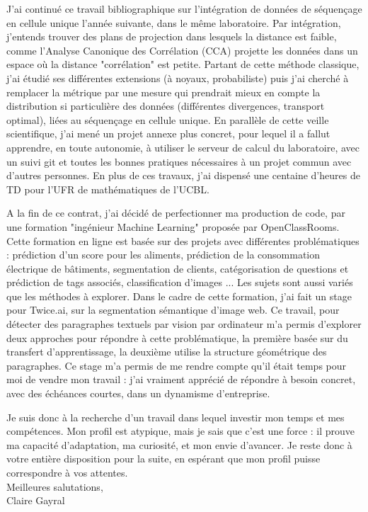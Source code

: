 \documentclass[a4paper,11pt]{article}
\begin{document}
J'ai continué ce travail bibliographique sur l'intégration de données de séquençage en cellule unique l'année suivante, dans le même laboratoire.
%
Par intégration, j'entends trouver des plans de projection dans lesquels la distance est faible, comme l'Analyse Canonique des Corrélation (CCA) projette les données dans un espace où la distance "corrélation" est petite. Partant de cette méthode classique, j'ai étudié ses différentes extensions (à noyaux, probabiliste) puis j'ai cherché à remplacer la métrique par une mesure qui prendrait mieux en compte la distribution si particulière des données (différentes divergences, transport optimal), liées au séquençage en cellule unique. 
En parallèle de cette veille scientifique, j'ai mené un projet annexe plus concret, pour lequel il a fallut apprendre, en toute autonomie, à utiliser le serveur de calcul du laboratoire, avec un suivi git et toutes les bonnes pratiques nécessaires à un projet commun avec d'autres personnes.
En plus de ces travaux, j'ai dispensé une centaine d'heures de TD pour l'UFR de mathématiques de l'UCBL. 

A la fin de ce contrat, j'ai décidé de perfectionner ma production de code, par une formation "ingénieur Machine Learning" proposée par OpenClassRooms. Cette formation en ligne est basée sur des projets avec différentes problématiques : prédiction d'un score pour les aliments, prédiction de la consommation électrique de bâtiments, segmentation de clients, catégorisation de questions et prédiction de tags associés, classification d'images ... Les sujets sont aussi variés que les méthodes à explorer. Dans le cadre de cette formation, j'ai fait un stage pour Twice.ai, sur la segmentation sémantique d'image web. Ce travail, pour détecter des paragraphes textuels par vision par ordinateur m'a permis d'explorer deux approches pour répondre à cette problématique, la première basée sur du transfert d'apprentissage, la deuxième utilise la structure géométrique des paragraphes. 
Ce stage m'a permis de me rendre compte qu'il était temps pour moi de vendre mon travail : j'ai vraiment apprécié de répondre à besoin concret, avec des échéances courtes, dans un dynamisme d'entreprise.  

Je suis donc à la recherche d'un travail dans lequel investir mon temps et mes compétences. Mon profil est atypique, mais je sais que c'est une force : il prouve ma capacité d'adaptation, ma curiosité, et mon envie d'avancer. 
%
Je reste donc à votre entière disposition pour la suite, en espérant que mon profil puisse correspondre à vos attentes. \\

Meilleures salutations, \\

Claire Gayral
\end{document}
